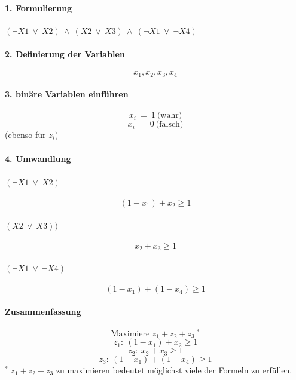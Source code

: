 \documentclass{article}
\begin{document}
\paragraph{1. Formulierung}
\begin{center}
   $(\neg X1\ \vee\ X2)\ \wedge\ (X2\ \vee\ X3) \ \wedge\ (\neg X1\ \vee\ \neg X4)$ 
\end{center} 
\paragraph{2. Definierung der Variablen}
\[
x_1 , x_2 , x_3 , x_4
\]
\paragraph{3. binäre Variablen einführen}
\[
x_i \ = \ 1 \ \text{(wahr)}
\]
\[
x_i \ = \ 0 \ \text{(falsch)}
\]
(ebenso für $z_i$)
\paragraph{4. Umwandlung }
\paragraph{$(\neg X1\ \vee\ X2)$}
\[
(1 - x_1) + x_2 \geq 1
\]
\paragraph{$(X2\ \vee\ X3))$}
\[ 
x_2 + x_3 \geq 1
\]
\paragraph{$(\neg X1\ \vee\ \neg X4)$}
\[
(1 - x_1) + ( 1 - x_4 ) \geq 1
\]
\paragraph*{Zusammenfassung}
\[
    \text{Maximiere } z_1 + z_2 + z_3 \ ^*
\] 
\[
z_1:\  (1 - x_1) + x_2 \geq 1
\]
\[
z_2:\  x_2 + x_3 \geq 1
\]
\[
z_3:\  (1 - x_1) + ( 1 - x_4 ) \geq 1
\]
\newline
\scriptsize{$^*$ $z_1 + z_2 + z_3 $ zu maximieren bedeutet möglichst viele der Formeln zu erfüllen.} 

\normalsize
\newpage
\end{document}
